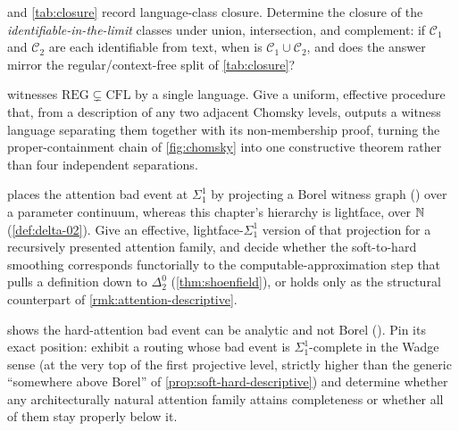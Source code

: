 \begin{openprob}
\label{op:recursive-closure}
 and \cref{tab:closure} record language-class closure. Determine the closure of the \emph{identifiable-in-the-limit} classes under union, intersection, and complement: if $\mathcal{C}_1$ and $\mathcal{C}_2$ are each identifiable from text, when is $\mathcal{C}_1 \cup \mathcal{C}_2$, and does the answer mirror the regular/context-free split of \cref{tab:closure}?
\end{openprob}

\begin{openprob}
\label{op:effective-witness}
 witnesses $\mathrm{REG} \subsetneq \mathrm{CFL}$ by a single language. Give a uniform, effective procedure that, from a description of any two adjacent Chomsky levels, outputs a witness language separating them together with its non-membership proof, turning the proper-containment chain of \cref{fig:chomsky} into one constructive theorem rather than four independent separations.
\end{openprob}

\begin{openprob}
\label{op:attention-lightface}
 places the attention bad event at $\Sigma^1_1$ by projecting a Borel witness graph () over a parameter continuum, whereas this chapter's hierarchy is lightface, over $\mathbb{N}$ (\cref{def:delta-02}). Give an effective, lightface-$\Sigma^1_1$ version of that projection for a recursively presented attention family, and decide whether the soft-to-hard smoothing corresponds functorially to the computable-approximation step that pulls a definition down to $\Delta^0_2$ (\cref{thm:shoenfield}), or holds only as the structural counterpart of \cref{rmk:attention-descriptive}.
\end{openprob}

\begin{openprob}
\label{op:attention-wadge}
 shows the hard-attention bad event can be analytic and not Borel (). Pin its exact position: exhibit a routing whose bad event is $\Sigma^1_1$-complete in the Wadge sense (at the very top of the first projective level, strictly higher than the generic ``somewhere above Borel'' of \cref{prop:soft-hard-descriptive}) and determine whether any architecturally natural attention family attains completeness or whether all of them stay properly below it.
\end{openprob}

